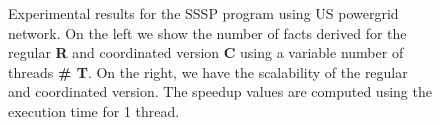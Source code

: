 \begin{figure}[h!]
   \begin{center}
   \end{center}
   \caption{Experimental results for the SSSP program using US powergrid network.
   On the left we show the number of facts derived for the regular \textbf{R}
   and coordinated version \textbf{C} using a variable number of threads
   \textbf{\# T}. On the right, we have the scalability of the regular and
   coordinated version. The speedup values are computed using the execution
   time for 1 thread.}
   \label{results:sssp_uspowergrid}
\end{figure}
